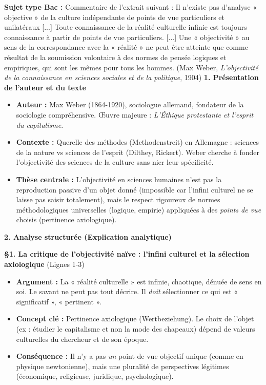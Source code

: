 \documentclass[11pt]{article}
\newcommand{\cle}[1]{{\popxbold\color{popdark}#1}}
\begin{document}
\begin{exoresolu}
    \textbf{Sujet type Bac :} Commentaire de l'extrait suivant :
    \guillemotleft Il n'existe pas d'analyse « objective » de la culture indépendante de points de vue particuliers et unilatéraux [...] Toute connaissance de la réalité culturelle infinie est toujours connaissance à partir de points de vue particuliers. [...] Une « objectivité » au sens de la correspondance avec la « réalité » ne peut être atteinte que comme résultat de la soumission volontaire à des normes de pensée logiques et empiriques, qui sont les mêmes pour tous les hommes. \guillemotright
    (Max Weber, \emph{L'objectivité de la connaissance en sciences sociales et de la politique}, 1904)
    \tcblower
    \textbf{1. Présentation de l'auteur et du texte}
    \begin{itemize}
        \item \textbf{Auteur :} Max Weber (1864-1920), sociologue allemand, fondateur de la sociologie compréhensive. Œuvre majeure : \emph{L'Éthique protestante et l'esprit du capitalisme}.
        \item \textbf{Contexte :} Querelle des méthodes (Methodenstreit) en Allemagne : sciences de la nature vs sciences de l'esprit (Dilthey, Rickert). Weber cherche à fonder l'objectivité des sciences de la culture sans nier leur spécificité.
        \item \textbf{Thèse centrale :} L'objectivité en sciences humaines n'est pas la reproduction passive d'un objet donné (impossible car l'infini culturel ne se laisse pas saisir totalement), mais le respect rigoureux de normes méthodologiques universelles (logique, empirie) appliquées à des \emph{points de vue} choisis (pertinence axiologique).
    \end{itemize}

    \textbf{2. Analyse structurée (Explication analytique)}

    \textbf{§1. La critique de l'objectivité naïve : l'infini culturel et la sélection axiologique} (Lignes 1-3)
    \begin{itemize}
        \item \textbf{Argument :} La « réalité culturelle » est infinie, chaotique, dénuée de sens en soi. Le savant ne peut pas tout décrire. Il \emph{doit} sélectionner ce qui est « significatif », « pertinent ».
        \item \textbf{Concept clé :} \cle{Pertinence axiologique} (Wertbeziehung). Le choix de l'objet (ex : étudier le capitalisme et non la mode des chapeaux) dépend de valeurs culturelles du chercheur et de son époque.
        \item \textbf{Conséquence :} Il n'y a pas \emph{un} point de vue objectif unique (comme en physique newtonienne), mais une pluralité de perspectives légitimes (économique, religieuse, juridique, psychologique).
    \end{itemize}


\end{exoresolu}
\end{document}
